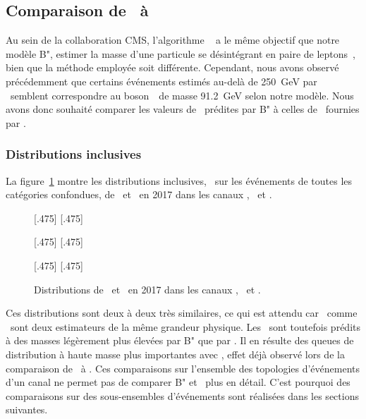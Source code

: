 \subsection{Comparaison de \mml\ à \msv}
Au sein de la collaboration CMS, l'algorithme \SVFIT~\cite{SVFit_Bianchini_2014} a le même objectif que notre modèle B",
estimer la masse d'une particule se désintégrant en paire de leptons~\tau,
bien que la méthode employée soit différente.
Cependant, nous avons observé précédemment que certains événements estimés au-delà de \SI{250}{\GeV} par \SVFIT\ semblent correspondre au boson~\Zboson\ de masse \SI{91.2}{\GeV} selon notre modèle.
Nous avons donc souhaité comparer
les valeurs de \mml\ prédites par B"
à celles de \msv\ fournies par \SVFIT.
\subsubsection{Distributions inclusives}
La figure~\ref{fig-svfit_vs_ml_2017}
montre les distributions inclusives, \ie\ sur les événements de toutes les catégories confondues, de \msv\ et \mml\ en 2017 dans les canaux \tauh\tauh, \ele\tauh\ et \ele\mu.
\begin{figure}[p]
\centering

[.475\textwidth]
{}
\hfill
{}[.475\textwidth]
{}

[.475\textwidth]
{}
\hfill
{}[.475\textwidth]
{}

[.475\textwidth]
{}
\hfill
{}[.475\textwidth]
{}

\caption[Distributions de \msv\ et \mml\ dans les canaux \tauh\tauh, \ele\tauh\ et \ele\mu.]{Distributions de \msv\ et \mml\ en 2017 dans les canaux \tauh\tauh, \ele\tauh\ et \ele\mu.}
\label{fig-svfit_vs_ml_2017}
\end{figure}
Ces distributions sont deux à deux très similaires,
ce qui est attendu car \msv\ comme \mml\ sont deux estimateurs de la même grandeur physique.
Les \ftauhs\ sont toutefois prédits à des masses légèrement plus élevées par B" que par \SVFIT.
Il en résulte des queues de distribution à haute masse plus importantes avec \mml,
effet déjà observé lors de la comparaison de \mml\ à \mTtot.
Ces comparaisons sur l'ensemble des topologies d'événements d'un canal ne permet pas de comparer B" et \SVFIT\ plus en détail.
C'est pourquoi des comparaisons sur des sous-ensembles d'événements sont réalisées dans les sections suivantes.
